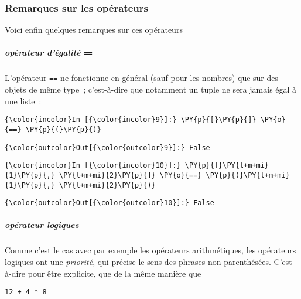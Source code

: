     \hypertarget{remarques-sur-les-opuxe9rateurs}{%
\subsubsection{Remarques sur les
opérateurs}\label{remarques-sur-les-opuxe9rateurs}}

    Voici enfin quelques remarques sur ces opérateurs

    \hypertarget{opuxe9rateur-duxe9galituxe9}{%
\subparagraph{\texorpdfstring{opérateur d'égalité
\texttt{==}}{opérateur d'égalité ==}}\label{opuxe9rateur-duxe9galituxe9}}

    L'opérateur \texttt{==} ne fonctionne en général (sauf pour les nombres)
que sur des objets de même type~; c'est-à-dire que notamment un tuple ne
sera jamais égal à une liste~:

    \begin{Verbatim}[commandchars=\\\{\}]
{\color{incolor}In [{\color{incolor}9}]:} \PY{p}{[}\PY{p}{]} \PY{o}{==} \PY{p}{(}\PY{p}{)}
\end{Verbatim}


\begin{Verbatim}[commandchars=\\\{\}]
{\color{outcolor}Out[{\color{outcolor}9}]:} False
\end{Verbatim}
            
    \begin{Verbatim}[commandchars=\\\{\}]
{\color{incolor}In [{\color{incolor}10}]:} \PY{p}{[}\PY{l+m+mi}{1}\PY{p}{,} \PY{l+m+mi}{2}\PY{p}{]} \PY{o}{==} \PY{p}{(}\PY{l+m+mi}{1}\PY{p}{,} \PY{l+m+mi}{2}\PY{p}{)}
\end{Verbatim}


\begin{Verbatim}[commandchars=\\\{\}]
{\color{outcolor}Out[{\color{outcolor}10}]:} False
\end{Verbatim}
            
    \hypertarget{opuxe9rateur-logiques}{%
\subparagraph{opérateur logiques}\label{opuxe9rateur-logiques}}

    Comme c'est le cas avec par exemple les opérateurs arithmétiques, les
opérateurs logiques ont une \emph{priorité}, qui précise le sens des
phrases non parenthésées. C'est-à-dire pour être explicite, que de la
même manière que

\begin{verbatim}
12 + 4 * 8 
\end{verbatim}

